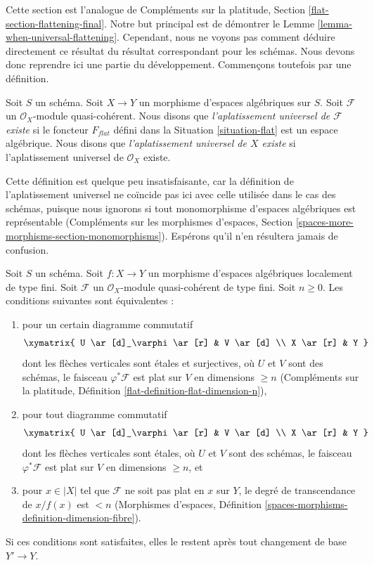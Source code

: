 \noindent
Cette section est l'analogue de
Compléments sur la platitude, Section \ref{flat-section-flattening-final}.
Notre but principal est de démontrer le
Lemme \ref{lemma-when-universal-flattening}.
Cependant, nous ne voyons pas comment déduire directement ce résultat
du résultat correspondant pour les schémas.
Nous devons donc reprendre ici une partie du développement.
Commençons toutefois par une définition.

\begin{definition}
\label{definition-flattening}
Soit $S$ un schéma.
Soit $X \to Y$ un morphisme d'espaces algébriques sur $S$.
Soit $\mathcal{F}$ un $\mathcal{O}_X$-module quasi-cohérent.
Nous disons que {\it l'aplatissement universel de $\mathcal{F}$ existe}
si le foncteur $F_{flat}$ défini dans la Situation \ref{situation-flat}
est un espace algébrique.
Nous disons que {\it l'aplatissement universel de $X$ existe}
si l'aplatissement universel de $\mathcal{O}_X$ existe.
\end{definition}

\noindent
Cette définition est quelque peu insatisfaisante, car la définition de
l'aplatissement universel ne coïncide pas ici avec celle utilisée dans le
cas des schémas, puisque nous ignorons si tout monomorphisme d'espaces
algébriques est représentable (Compléments sur les morphismes d'espaces,
Section \ref{spaces-more-morphisms-section-monomorphisms}).
Espérons qu'il n'en résultera jamais de confusion.

\begin{lemma}
\label{lemma-pre-flat-dimension-n}
Soit $S$ un schéma.
Soit $f : X \to Y$ un morphisme d'espaces algébriques
localement de type fini.
Soit $\mathcal{F}$ un $\mathcal{O}_X$-module quasi-cohérent de
type fini. Soit $n \geq 0$. Les conditions suivantes sont équivalentes :
\begin{enumerate}
\item pour un certain diagramme commutatif
$$
\xymatrix{
U \ar[d]_\varphi \ar[r] & V \ar[d] \\
X \ar[r] & Y
}
$$
dont les flèches verticales sont \'etales et surjectives, où $U$ et $V$ sont
des schémas, le faisceau $\varphi^*\mathcal{F}$ est plat sur $V$
en dimensions $\geq n$ (Compléments sur la platitude, Définition
\ref{flat-definition-flat-dimension-n}),
\item pour tout diagramme commutatif
$$
\xymatrix{
U \ar[d]_\varphi \ar[r] & V \ar[d] \\
X \ar[r] & Y
}
$$
dont les flèches verticales sont \'etales, où $U$ et $V$ sont des schémas,
le faisceau $\varphi^*\mathcal{F}$ est plat sur $V$ en dimensions $\geq n$, et
\item pour $x \in |X|$ tel que $\mathcal{F}$ ne soit pas plat en $x$
sur $Y$, le degré de transcendance de $x/f(x)$ est $< n$ (Morphismes d'espaces,
Définition \ref{spaces-morphisms-definition-dimension-fibre}).
\end{enumerate}
Si ces conditions sont satisfaites, elles le restent après tout changement de base $Y' \to Y$.
\end{lemma}

